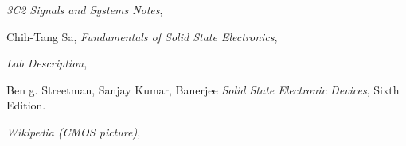 \documentclass{article}
\begin{document}
\appendix


	
	\begin{thebibliography}{3}
  \emph{3C2 Signals and Systems Notes},
  
  Chih-Tang Sa,
  \emph{Fundamentals of Solid State Electronics},

  
  \emph{Lab Description},
  
  
  
  Ben g. Streetman,  Sanjay Kumar, Banerjee
  \emph{Solid State Electronic Devices},
  Sixth Edition.
  

  \emph{Wikipedia (CMOS picture)},

  
\end{thebibliography}
	
\end{document}

